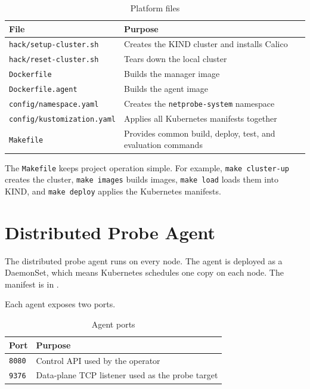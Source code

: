 \documentclass[11pt,a4paper]{article}
\newcommand{\code}[1]{\texttt{#1}}
\begin{document}
\begin{table}[h]
\centering
\caption{Platform files}
\begin{tabularx}{\textwidth}{@{}lY@{}}
\toprule
\textbf{File} & \textbf{Purpose} \\
\midrule
\code{hack/setup-cluster.sh} & Creates the KIND cluster and installs Calico \\
\code{hack/reset-cluster.sh} & Tears down the local cluster \\
\code{Dockerfile} & Builds the manager image \\
\code{Dockerfile.agent} & Builds the agent image \\
\code{config/namespace.yaml} & Creates the \code{netprobe-system} namespace \\
\code{config/kustomization.yaml} & Applies all Kubernetes manifests together \\
\code{Makefile} & Provides common build, deploy, test, and evaluation commands \\
\bottomrule
\end{tabularx}
\end{table}

The \code{Makefile} keeps project operation simple. For example, \code{make cluster-up} creates the cluster, \code{make images} builds images, \code{make load} loads them into KIND, and \code{make deploy} applies the Kubernetes manifests.

\section{Distributed Probe Agent}

The distributed probe agent runs on every node. The agent is deployed as a DaemonSet, which means Kubernetes schedules one copy on each node. The manifest is in .

Each agent exposes two ports.

\begin{table}[h]
\centering
\caption{Agent ports}
\begin{tabularx}{0.72\textwidth}{@{}lY@{}}
\toprule
\textbf{Port} & \textbf{Purpose} \\
\midrule
\code{8080} & Control API used by the operator \\
\code{9376} & Data-plane TCP listener used as the probe target \\
\bottomrule
\end{tabularx}
\end{table}
\end{document}
